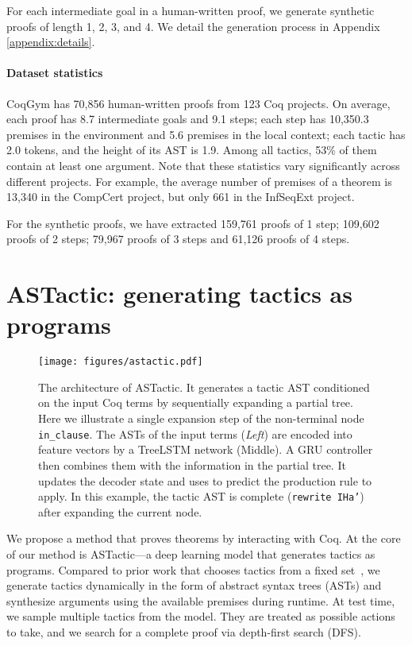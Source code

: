 \documentclass{article}
\newcommand{\smallsec}[1]{\vspace{-3mm} \paragraph{#1}}
\newcommand{\datasetname}{CoqGym}
\newcommand{\numberofprojects}{123 }
\newcommand{\numberofproofs}{70,856 }
\begin{document}
For each intermediate goal in a human-written proof, we generate synthetic proofs of length 1, 2, 3, and 4. We detail the generation process in Appendix \ref{appendix:details}.




\smallsec{Dataset statistics}
{\datasetname } has \numberofproofs human-written proofs from \numberofprojects Coq projects.
On average, each proof has 8.7 intermediate goals and 9.1 steps; each step has 10,350.3 premises in the environment and 5.6 premises in the local context; each tactic has 2.0 tokens, and the height of its AST is 1.9.
Among all tactics, 53\% of them contain at least one argument.
Note that these statistics vary significantly across different projects. For example, the average number of premises of a theorem is 13,340 in the CompCert project, but only 661 in the InfSeqExt project.



For the synthetic proofs, we have extracted 159,761 proofs of 1 step; 109,602 proofs of 2 steps; 79,967 proofs of 3 steps and 61,126 proofs of 4 steps.




\section{ASTactic: generating tactics as programs}


\begin{figure*}[ht]
\vskip 0.2in
\begin{center}
\vspace{-8mm}
\centerline{\texttt{[image: figures/astactic.pdf]}}
\vspace{-4mm}
\caption{The architecture of ASTactic. It generates a tactic AST conditioned on the input Coq terms by sequentially expanding a partial tree. Here we illustrate a single expansion step of the non-terminal node \texttt{in\_clause}. The ASTs of the input terms (\textit{Left}) are encoded into feature vectors by a TreeLSTM network (Middle). A GRU controller then combines them with the information in the partial tree. It updates the decoder state  and uses  to predict the production rule to apply. In this example, the tactic AST is complete (\texttt{rewrite IHa'}) after expanding the current node.}
\vspace{-4mm}
\label{fig:astactic}
\end{center}
\vskip -0.2in
\end{figure*}

We propose a method that proves theorems by interacting with Coq.
At the core of our method is ASTactic---a deep learning model that generates tactics as programs.
Compared to prior work that chooses tactics from a fixed set~\citep{huang2018gamepad,gransden2015sepia,gauthier2018learning,bansal2019holist}, we generate tactics dynamically in the form of abstract syntax trees (ASTs) and synthesize arguments using the available premises during runtime.
At test time, we sample multiple tactics from the model.
They are treated as possible actions to take, and we search for a complete proof via depth-first search (DFS).
\end{document}
